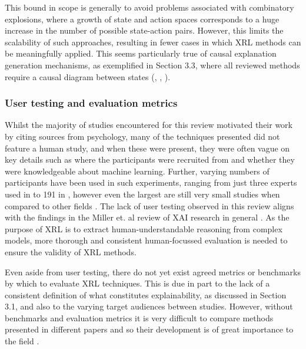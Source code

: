 \documentclass{article}
\begin{document}
This bound in scope is generally to avoid problems associated with combinatory explosions, where a growth of state and action spaces corresponds to a huge increase in the number of possible state-action pairs. However, this limits the scalability of such approaches, resulting in fewer cases in which XRL methods can be meaningfully applied. This seems particularly true of causal explanation generation mechanisms, as exemplified in  Section 3.3, where all reviewed methods require a causal diagram between states (\cite{madumal2020distal}, \cite{madumal2020explainable}, \cite{wang2022causal}). 


\subsubsection{User testing and evaluation metrics}

Whilst the majority of studies encountered for this review motivated their work by citing sources from psychology, many of the techniques presented did not feature a human study, and when these were present, they were often vague on key details such as where the participants were recruited from and whether they were knowledgeable about machine learning. Further, varying numbers of participants have been used in such experiments, ranging from just three experts used in \cite{wang2018dqnviz} to 191 in \cite{huang2019enabling}, however even the largest are still very small studies when compared to other fields \cite{wells2021explainable}. The lack of user testing observed in this review aligns with the findings in the Miller et. al review of XAI research in general \cite{miller2017explainable}. As the purpose of XRL is to extract human-understandable reasoning from complex models, more thorough and consistent human-focussed evaluation is needed to ensure the validity of XRL methods.

Even aside from user testing, there do not yet exist agreed metrics or benchmarks by which to evaluate XRL techniques. This is due in part to the lack of a consistent definition of what constitutes explainability, as discussed in Section 3.1, and also to the varying target audiences between studies. However, without benchmarks and evaluation metrics it is very difficult to compare methods presented in different papers and so their development is of great importance to the field \cite{ehsan2019automated}.




\pagebreak
\end{document}
